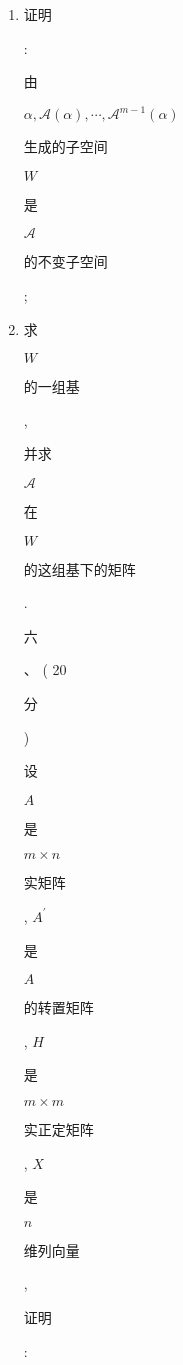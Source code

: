\documentclass[10pt]{article}
\begin{document}
\begin{enumerate}
  \item \begin{CJK}{UTF8}{mj}证明\end{CJK}: \begin{CJK}{UTF8}{mj}由\end{CJK} $\alpha, \mathscr{A}(\alpha), \cdots, \mathscr{A}^{m-1}(\alpha)$ \begin{CJK}{UTF8}{mj}生成的子空间\end{CJK} $W$ \begin{CJK}{UTF8}{mj}是\end{CJK} $\mathscr{A}$ \begin{CJK}{UTF8}{mj}的不变子空间\end{CJK};

  \item \begin{CJK}{UTF8}{mj}求\end{CJK} $W$ \begin{CJK}{UTF8}{mj}的一组基\end{CJK}, \begin{CJK}{UTF8}{mj}并求\end{CJK} $\mathscr{A}$ \begin{CJK}{UTF8}{mj}在\end{CJK} $W$ \begin{CJK}{UTF8}{mj}的这组基下的矩阵\end{CJK}. \begin{CJK}{UTF8}{mj}六\end{CJK}、 ( 20 \begin{CJK}{UTF8}{mj}分\end{CJK}) \begin{CJK}{UTF8}{mj}设\end{CJK} $A$ \begin{CJK}{UTF8}{mj}是\end{CJK} $m \times n$ \begin{CJK}{UTF8}{mj}实矩阵\end{CJK}, $A^{\prime}$ \begin{CJK}{UTF8}{mj}是\end{CJK} $A$ \begin{CJK}{UTF8}{mj}的转置矩阵\end{CJK}, $H$ \begin{CJK}{UTF8}{mj}是\end{CJK} $m \times m$ \begin{CJK}{UTF8}{mj}实正定矩阵\end{CJK}, $X$ \begin{CJK}{UTF8}{mj}是\end{CJK} $n$ \begin{CJK}{UTF8}{mj}维列向量\end{CJK}, \begin{CJK}{UTF8}{mj}证明\end{CJK}:


\end{enumerate}
\end{document}
